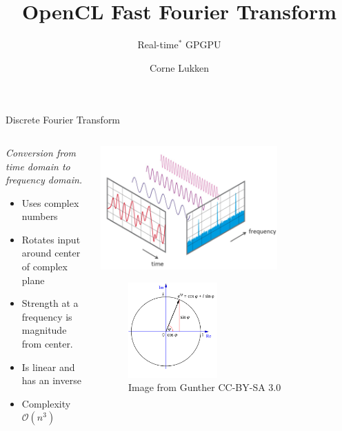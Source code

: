 \documentclass{beamer}
\author{Corne Lukken}
\title{OpenCL Fast Fourier Transform}
\subtitle{Real-time$^*$ GPGPU}
\begin{document}

\frame{\titlepage}



\begin{frame}{Discrete Fourier Transform}
	\begingroup
	\small
	\begin{columns}
		\begin{column}{0.45\textwidth}
			\textit{Conversion from time domain to frequency domain.}
			\begin{itemize}
				\item{Uses complex numbers}
				\item{Rotates input around center of complex plane}
				\item{Strength at a frequency is magnitude from center.}
				\item{Is linear and has an inverse}
				\item{Complexity $\mathcal{O}(n^3)$}
			\end{itemize}
		\end{column}
		\begin{column}{0.55\textwidth}
			\includegraphics[width=0.7\textwidth,center]{resources/images/fft.png}
			\begin{figure}
				\includegraphics[width=0.45\textwidth,center]{resources/images/euler.png}
				\caption{\tiny Image from Gunther CC-BY-SA 3.0}
			\end{figure}
		\end{column}
	\end{columns}
	\endgroup
\end{frame}
\end{document}
